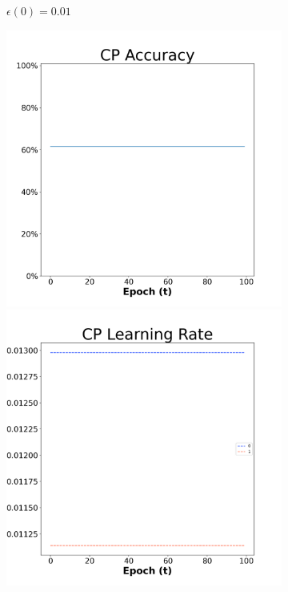 \begin{figure}[H]
\begin{subfigure}{0.3\textwidth}
\caption{$\epsilon(0)=0.01$}
\end{subfigure}\hfil %
\begin{subfigure}{0.3\textwidth}
\includegraphics[width=\linewidth]{images/exper1/SP/CP_0.03_acc.png}
\includegraphics[width=\linewidth]{images/exper1/SP/CP_0.03_lr.png}

\end{subfigure}
\end{figure}
